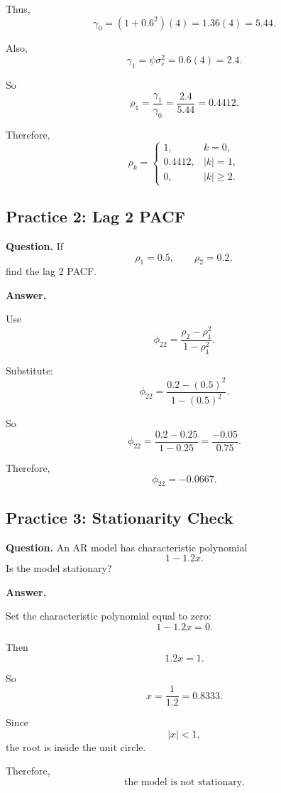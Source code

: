 \documentclass[12pt]{article}
\begin{document}
Thus,
\[
\gamma_0=(1+0.6^2)(4)=1.36(4)=5.44.
\]

Also,
\[
\gamma_1=\psi\sigma_e^2=0.6(4)=2.4.
\]

So
\[
\rho_1=\frac{\gamma_1}{\gamma_0}
=
\frac{2.4}{5.44}
=
0.4412.
\]

Therefore,
\[
\boxed{
\rho_k=
\begin{cases}
1, & k=0,\\
0.4412, & |k|=1,\\
0, & |k|\geq 2.
\end{cases}
}
\]

\subsection*{Practice 2: Lag 2 PACF}

\textbf{Question.} If
\[
\rho_1=0.5,\qquad \rho_2=0.2,
\]
find the lag 2 PACF.

\textbf{Answer.}

Use
\[
\phi_{22}=\frac{\rho_2-\rho_1^2}{1-\rho_1^2}.
\]

Substitute:
\[
\phi_{22}
=
\frac{0.2-(0.5)^2}{1-(0.5)^2}.
\]

So
\[
\phi_{22}
=
\frac{0.2-0.25}{1-0.25}
=
\frac{-0.05}{0.75}.
\]

Therefore,
\[
\boxed{\phi_{22}=-0.0667}.
\]

\subsection*{Practice 3: Stationarity Check}

\textbf{Question.} An AR model has characteristic polynomial
\[
1-1.2x.
\]
Is the model stationary?

\textbf{Answer.}

Set the characteristic polynomial equal to zero:
\[
1-1.2x=0.
\]

Then
\[
1.2x=1.
\]

So
\[
x=\frac{1}{1.2}=0.8333.
\]

Since
\[
|x|<1,
\]
the root is inside the unit circle.

Therefore,
\[
\boxed{\text{the model is not stationary.}}
\]
\end{document}
